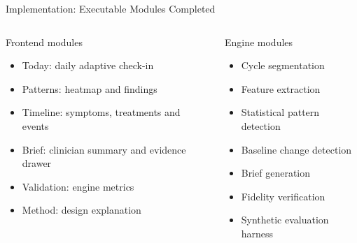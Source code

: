 \documentclass[aspectratio=169,11pt]{beamer}
\begin{document}
\begin{frame}{Implementation: Executable Modules Completed}
  \begin{columns}[T]
      \begin{block}{Frontend modules}
        \begin{itemize}
          \item Today: daily adaptive check-in
          \item Patterns: heatmap and findings
          \item Timeline: symptoms, treatments and events
          \item Brief: clinician summary and evidence drawer
          \item Validation: engine metrics
          \item Method: design explanation
        \end{itemize}
      \end{block}
      \begin{block}{Engine modules}
        \begin{itemize}
          \item Cycle segmentation
          \item Feature extraction
          \item Statistical pattern detection
          \item Baseline change detection
          \item Brief generation
          \item Fidelity verification
          \item Synthetic evaluation harness
        \end{itemize}
      \end{block}
  \end{columns}
\end{frame}
\end{document}
